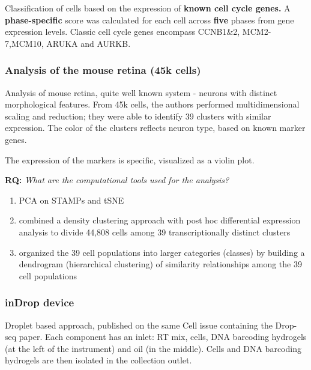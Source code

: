 Classification of cells based on the expression of \textbf{known cell
cycle genes.} A \textbf{phase-specific} score was calculated for each
cell across \textbf{five} phases from gene expression levels. Classic
cell cycle genes encompass CCNB1\&2, MCM2-7,MCM10, ARUKA and AURKB.

\hypertarget{analysis-of-the-mouse-retina-45k-cells}{%
\subsubsection{Analysis of the mouse retina (45k
cells)}\label{analysis-of-the-mouse-retina-45k-cells}}

Analysis of mouse retina, quite well known system - neurons with
distinct morphological features. From 45k cells, the authors performed
multidimensional scaling and reduction; they were able to identify 39
clusters with similar expression. The color of the clusters reflects
neuron type, based on known marker genes.

The expression of the markers is specific, visualized as a violin plot.

\begin{tcolorbox}
[width=\linewidth, sharp corners=all, colback=white!95!black]

\textbf{RQ: }
\emph{What are the computational tools used for the analysis?}

\begin{enumerate}
\def\labelenumi{\arabic{enumi}.}
\tightlist
\item
  PCA on STAMPs and tSNE
\item
  combined a density clustering approach with post hoc differential
  expression analysis to divide 44,808 cells among 39 transcriptionally
  distinct clusters
\item
  organized the 39 cell populations into larger categories (classes) by
  building a dendrogram (hierarchical clustering) of similarity
  relationships among the 39 cell populations
\end{enumerate}
\end{tcolorbox}

\hypertarget{indrop-device}{%
\subsubsection{inDrop device}\label{indrop-device}}

Droplet based approach, published on the same Cell issue containing the
Drop-seq paper. Each component has an inlet: RT mix, cells, DNA
barcoding hydrogels (at the left of the instrument) and oil (in the
middle). Cells and DNA barcoding hydrogels are then isolated in the
collection outlet.

